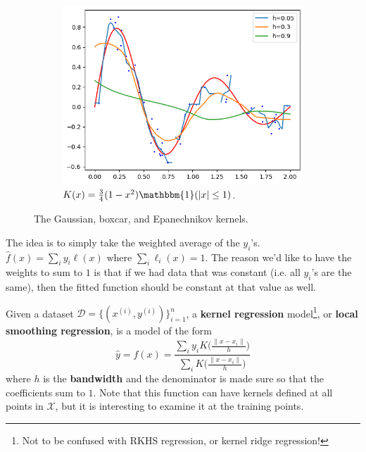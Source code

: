 \begin{example}
\begin{figure}[H]
\begin{subfigure}[b]{0.32\textwidth}
        \label{fig:boxcar_smoother}
      \end{subfigure}
      \hfill 
      \begin{subfigure}[b]{0.32\textwidth}
        \centering
        \includegraphics[scale=0.33]{img/epanechnikov_smoother.png}
        \caption{$K(x) = \frac{3}{4} (1 - x^2) \mathbbm{1}(|x| \leq 1)$.} 
        \label{fig:epanechnikov_smoother}
      \end{subfigure}
      \caption{The Gaussian, boxcar, and Epanechnikov kernels.}
    \end{figure}
  \end{example}
  
  The idea is to simply take the weighted average of the $y_i$'s. $\hat{f} (x) = \sum_{i} y_i \ell(x) \text{ where } \sum_{i} \ell_i (x) = 1$. The reason we'd like to have the weights to sum to $1$ is that if we had data that was constant (i.e. all $y_i$'s are the same), then the fitted function should be constant at that value as well. 

  \begin{definition}
    Given a dataset $\mathcal{D} = \{(x^{(i)}, y^{(i)})\}_{i=1}^n$, a \textbf{kernel regression} model\footnote{Not to be confused with RKHS regression, or kernel ridge regression!}, or \textbf{local smoothing regression}, is a model of the form 
    \begin{equation}
      \hat{y} = f(x) = \frac{\sum_{i} y_i K \bigg( \frac{\|x - x_i\|}{h} \bigg)}{\sum_{i} K \bigg( \frac{\|x - x_i\|}{h} \bigg)}
    \end{equation}
    where $h$ is the \textbf{bandwidth} and the denominator is made sure so that the coefficients sum to $1$. Note that this function can have kernels defined at all points in $\mathcal{X}$, but it is interesting to examine it at the training points. 
  \end{definition}

